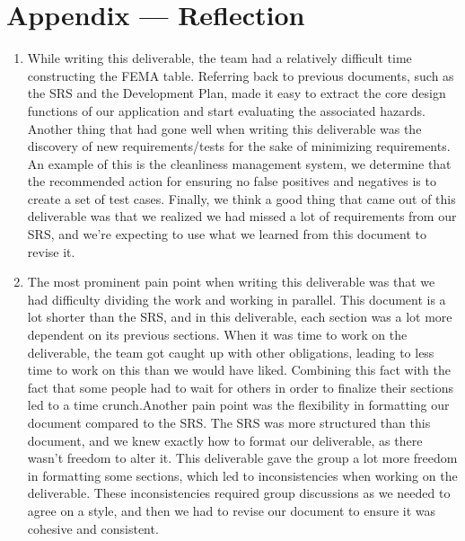 \documentclass[12pt, titlepage]{article}
\begin{document}
\newpage{}

\section*{Appendix --- Reflection}

\begin{enumerate}
    \item While writing this deliverable, the team had a relatively difficult time constructing the FEMA table. Referring back to previous documents, such as the SRS and the Development Plan, made it easy to extract the core design functions of our application and start evaluating the associated hazards. Another thing that had gone well when writing this deliverable was the discovery of new requirements/tests for the sake of minimizing requirements. An example of this is the cleanliness management system, we determine that the recommended action for ensuring no false positives and negatives is to create a set of test cases. Finally, we think a good thing that came out of this deliverable was that we realized we had missed a lot of requirements from our SRS, and we're expecting to use what we learned from this document to revise it.
    
    \item The most prominent pain point when writing this deliverable was that we had difficulty dividing the work and working in parallel. This document is a lot shorter than the SRS, and in this deliverable, each section was a lot more dependent on its previous sections. When it was time to work on the deliverable, the team got caught up with other obligations, leading to less time to work on this than we would have liked. Combining this fact with the fact that some people had to wait for others in order to finalize their sections led to a time crunch.\newline Another pain point was the flexibility in formatting our document compared to the SRS. The SRS was more structured than this document, and we knew exactly how to format our deliverable, as there wasn't freedom to alter it. This deliverable gave the group a lot more freedom in formatting some sections, which led to inconsistencies when working on the deliverable. These inconsistencies required group discussions as we needed to agree on a style, and then we had to revise our document to ensure it was cohesive and consistent. 
    

\end{enumerate}
\end{document}

